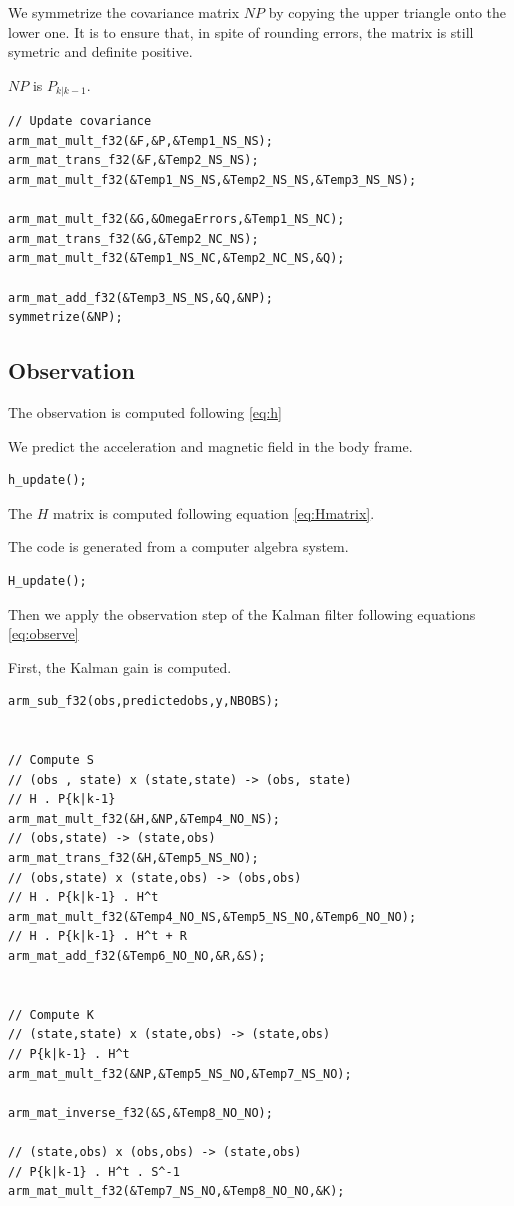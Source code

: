 \documentclass[titlepage,a4,12pt]{article}
\numberwithin{equation}{subsection}
\newcommand{\before}[1]{#1_{k|k-1}}
\begin{document}
We symmetrize the covariance matrix $NP$ by copying the upper triangle onto the lower one. It is to ensure that, in spite of rounding errors, the matrix is still symetric and definite positive.

$NP$ is $\before{P}$.

\begin{verbatim}
// Update covariance
arm_mat_mult_f32(&F,&P,&Temp1_NS_NS);
arm_mat_trans_f32(&F,&Temp2_NS_NS);
arm_mat_mult_f32(&Temp1_NS_NS,&Temp2_NS_NS,&Temp3_NS_NS);
  
arm_mat_mult_f32(&G,&OmegaErrors,&Temp1_NS_NC);
arm_mat_trans_f32(&G,&Temp2_NC_NS);
arm_mat_mult_f32(&Temp1_NS_NC,&Temp2_NC_NS,&Q);
  
arm_mat_add_f32(&Temp3_NS_NS,&Q,&NP);
symmetrize(&NP);

\end{verbatim}

\subsection{Observation}

The observation is computed following \ref{eq:h}

We predict the acceleration and magnetic field in the body frame.

\begin{verbatim}
h_update();
\end{verbatim}

The $H$ matrix is computed following equation \ref{eq:Hmatrix}.

The code is generated from a computer algebra system.

\begin{verbatim}
H_update();
\end{verbatim}

Then we apply the observation step of the Kalman filter following equations \ref{eq:observe}

First, the Kalman gain is computed.

\begin{verbatim}
arm_sub_f32(obs,predictedobs,y,NBOBS);


// Compute S
// (obs , state) x (state,state) -> (obs, state) 
// H . P{k|k-1}
arm_mat_mult_f32(&H,&NP,&Temp4_NO_NS);
// (obs,state) -> (state,obs)
arm_mat_trans_f32(&H,&Temp5_NS_NO);
// (obs,state) x (state,obs) -> (obs,obs)
// H . P{k|k-1} . H^t
arm_mat_mult_f32(&Temp4_NO_NS,&Temp5_NS_NO,&Temp6_NO_NO);
// H . P{k|k-1} . H^t + R
arm_mat_add_f32(&Temp6_NO_NO,&R,&S);
   

// Compute K 
// (state,state) x (state,obs) -> (state,obs)
// P{k|k-1} . H^t
arm_mat_mult_f32(&NP,&Temp5_NS_NO,&Temp7_NS_NO);

arm_mat_inverse_f32(&S,&Temp8_NO_NO);

// (state,obs) x (obs,obs) -> (state,obs)
// P{k|k-1} . H^t . S^-1
arm_mat_mult_f32(&Temp7_NS_NO,&Temp8_NO_NO,&K);
\end{verbatim}
\end{document}
